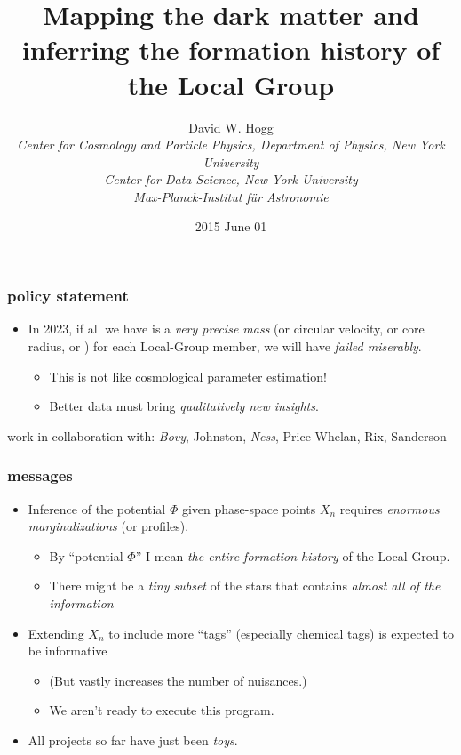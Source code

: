 \documentclass[pdftex]{beamer}
\title{Mapping the dark matter and inferring the formation history of the Local Group}
\author[David W. Hogg (NYU)]{David W. Hogg \\
  \textsl{\footnotesize Center for Cosmology and Particle Physics, Department of Physics,
                 New York University}\\
  \textsl{\footnotesize Center for Data Science,
                 New York University}\\
  \textsl{\footnotesize Max-Planck-Institut f\"ur Astronomie}}
\date{2015 June 01}
\begin{document}
\begin{frame}
  \frametitle{policy statement}
  \begin{itemize}
  \item In 2023, if all we have is a \emph{very precise mass} (or
    circular velocity, or core radius, or \etc) for each Local-Group
    member, we will have \emph{failed miserably}.
    \begin{itemize}
    \item This is not like cosmological parameter estimation!
    \item Better data must bring \emph{qualitatively new insights}.
    \end{itemize}
  \end{itemize}
\end{frame}

\begin{frame}
  \titlepage
  {\footnotesize work in collaboration with: \emph{Bovy}, Johnston, \emph{Ness}, Price-Whelan, Rix, Sanderson}
\end{frame}

\newcommand{\messages}{%
\begin{frame}
  \frametitle{messages}
  \begin{itemize}
  \item Inference of the potential $\Phi$ given phase-space points
    $X_n$ requires \emph{enormous marginalizations} (or profiles).
    \begin{itemize}
    \item By ``potential $\Phi$'' I mean \emph{the entire formation history}
      of the Local Group.
    \item There might be a \emph{tiny subset} of the stars that contains
      \emph{almost all of the information}
    \end{itemize}
  \item Extending $X_n$ to include more ``tags'' (especially chemical
    tags) is expected to be informative
    \begin{itemize}
    \item (But vastly increases the number of nuisances.)
    \item We aren't ready to execute this program.
    \end{itemize}
  \item All projects so far have just been \emph{toys}.
  \end{itemize}
\end{frame}}

\messages
\end{document}
